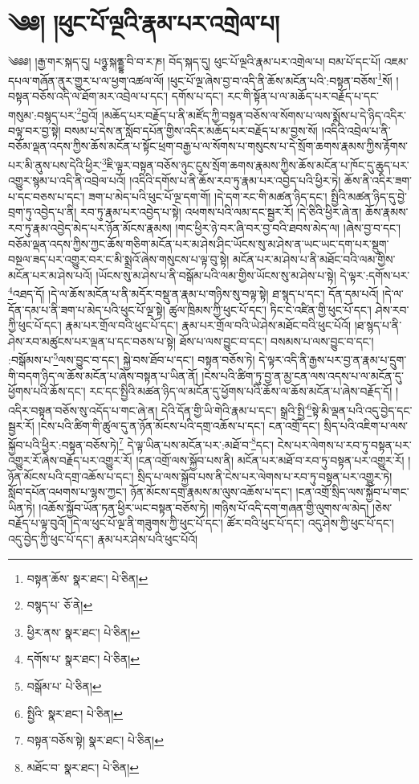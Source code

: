 \setcounter{footnote}{0} 
\chapter{༄༅། །ཕུང་པོ་ལྔའི་རྣམ་པར་འགྲེལ་པ།}༄༅༅། །རྒྱ་གར་སྐད་དུ། པཉྩ་སྐནྡྷ་བི་བ་ར་ཎ། བོད་སྐད་དུ། ཕུང་པོ་ལྔའི་རྣམ་པར་འགྲེལ་པ། བམ་པོ་དང་པོ། འཇམ་དཔལ་གཞོན་ནུར་གྱུར་པ་ལ་ཕྱག་འཚལ་ལོ། །ཕུང་པོ་ལྔ་ཞེས་བྱ་བ་འདི་ནི་ཆོས་མངོན་པའི་:བསྟན་བཅོས་\footnote{བསྟན་ཆོས་  སྣར་ཐང་།  པེ་ཅིན། }སོ། །བསྟན་བཅོས་འདི་ལ་ཐོག་མར་འབྲེལ་པ་དང་། དགོས་པ་དང་། རང་གི་སྟོན་པ་ལ་མཆོད་པར་བརྗོད་པ་དང་གསུམ་:བསྙད་པར་\footnote{བསྙད་པ་  ཅོ་ནེ། }བྱའོ། །མཆོད་པར་བརྗོད་པ་ནི་མཛོད་ཀྱི་བསྟན་བཅོས་ལ་སོགས་པ་ལས་སྨོས་པ་དེ་ཉིད་འདིར་བལྟ་བར་བྱ་སྟེ། བསམ་པ་དེས་ན་སློབ་དཔོན་གྱིས་འདིར་མཆོད་པར་བརྗོད་པ་མ་བྱས་སོ། །འདིའི་འབྲེལ་པ་ནི་བཅོམ་ལྡན་འདས་ཀྱིས་ཆོས་མངོན་པ་སྟོང་ཕྲག་བརྒྱ་པ་ལ་སོགས་པ་གསུངས་པ་དེ་སྲོག་ཆགས་རྣམས་ཀྱིས་རྟོགས་པར་མི་ནུས་པས་དེའི་ཕྱིར་\footnote{ཕྱིར་ནས་  སྣར་ཐང་།  པེ་ཅིན། }ཇི་ལྟར་བསྟན་བཅོས་ཉུང་ངུས་སྲོག་ཆགས་རྣམས་ཀྱིས་ཆོས་མངོན་པ་ཁོང་དུ་ཆུད་པར་འགྱུར་སྙམ་པ་འདི་ནི་འབྲེལ་པའོ། །འདིའི་དགོས་པ་ནི་ཆོས་རབ་ཏུ་རྣམ་པར་འབྱེད་པའི་ཕྱིར་ཏེ། ཆོས་ནི་འདིར་ཟག་པ་དང་བཅས་པ་དང་། ཟག་པ་མེད་པའི་ཕུང་པོ་ལྔ་དག་གོ། །དེ་དག་རང་གི་མཚན་ཉིད་དང་། སྤྱིའི་མཚན་ཉིད་དུ་བྱེ་བྲག་ཏུ་འབྱེད་པ་ནི། རབ་ཏུ་རྣམ་པར་འབྱེད་པ་སྟེ། འཕགས་པའི་ལམ་དང་སྦྱར་རོ། །དེ་ཅིའི་ཕྱིར་ཞེ་ན། ཆོས་རྣམས་རབ་ཏུ་རྣམ་འབྱེད་མེད་པར་ཉོན་མོངས་རྣམས། །གང་ཕྱིར་ཉེ་བར་ཞི་བར་བྱ་བའི་ཐབས་མེད་ལ། །ཞེས་བྱ་བ་དང་། བཅོམ་ལྡན་འདས་ཀྱིས་ཀྱང་ཆོས་གཅིག་མངོན་པར་མ་ཤེས་ཤིང་ཡོངས་སུ་མ་ཤེས་ན་ཡང་ཡང་དག་པར་སྡུག་བསྔལ་ཟད་པར་འགྱུར་བར་ང་མི་སྨྲའོ་ཞེས་གསུངས་པ་ལྟ་བུ་སྟེ། མངོན་པར་མ་ཤེས་པ་ནི་མཐོང་བའི་ལམ་གྱིས་མངོན་པར་མ་ཤེས་པའོ། །ཡོངས་སུ་མ་ཤེས་པ་ནི་བསྒོམ་པའི་ལམ་གྱིས་ཡོངས་སུ་མ་ཤེས་པ་སྟེ། དེ་ལྟར་:དགོས་པར་\footnote{དགོས་པ་  སྣར་ཐང་།  པེ་ཅིན། }འཐད་དོ། །དེ་ལ་ཆོས་མངོན་པ་ནི་མདོར་བསྡུ་ན་རྣམ་པ་གཉིས་སུ་བལྟ་སྟེ། ཐ་སྙད་པ་དང་། དོན་དམ་པའོ། །དེ་ལ་དོན་དམ་པ་ནི་ཟག་པ་མེད་པའི་ཕུང་པོ་ལྔ་སྟེ། ཚུལ་ཁྲིམས་ཀྱི་ཕུང་པོ་དང་། ཏིང་ངེ་འཛིན་གྱི་ཕུང་པོ་དང་། ཤེས་རབ་ཀྱི་ཕུང་པོ་དང་། རྣམ་པར་གྲོལ་བའི་ཕུང་པོ་དང་། རྣམ་པར་གྲོལ་བའི་ཡེ་ཤེས་མཐོང་བའི་ཕུང་པོའོ། །ཐ་སྙད་པ་ནི་ཤེས་རབ་མཚུངས་པར་ལྡན་པ་དང་བཅས་པ་སྟེ། ཐོས་པ་ལས་བྱུང་བ་དང་། བསམས་པ་ལས་བྱུང་བ་དང་། :བསྒོམས་པ་\footnote{བསྒོམ་པ་  པེ་ཅིན། }ལས་བྱུང་བ་དང་། སྐྱེ་བས་ཐོབ་པ་དང་། བསྟན་བཅོས་ཏེ། དེ་ལྟར་འདི་ནི་རྒྱས་པར་བྱ་ན་རྣམ་པ་དྲུག་གི་བདག་ཉིད་ལ་ཆོས་མངོན་པ་ཞེས་བསྟན་པ་ཡིན་ནོ། །ངེས་པའི་ཚིག་ཏུ་བྱ་ན་མྱ་ངན་ལས་འདས་པ་ལ་མངོན་དུ་ཕྱོགས་པའི་ཆོས་དང་། རང་དང་སྤྱིའི་མཚན་ཉིད་ལ་མངོན་དུ་ཕྱོགས་པའི་ཆོས་ལ་ཆོས་མངོན་པ་ཞེས་བརྗོད་དོ། །འདིར་བསྟན་བཅོས་སུ་འདོད་པ་གང་ཞེ་ན། དེའི་དོན་གྱི་ཡི་གེའི་རྣམ་པ་དང་། སྒྲའི་སྤྱི་\footnote{སྤྱིའི་  སྣར་ཐང་།  པེ་ཅིན། }སྟེ་མི་ལྡན་པའི་འདུ་བྱེད་དང་སྦྱར་རོ། །ངེས་པའི་ཚིག་གི་ཚུལ་དུ་ན་ཉོན་མོངས་པའི་དགྲ་འཆོས་པ་དང་། ངན་འགྲོ་དང་། སྲིད་པའི་འཇིག་པ་ལས་སྐྱོབ་པའི་ཕྱིར་:བསྟན་བཅོས་ཏེ།\footnote{བསྟན་བཅོས་སྟེ།  སྣར་ཐང་།  པེ་ཅིན། } དེ་ལྟ་ཡིན་པས་མངོན་པར་:མཐོ་བ་\footnote{མཐོང་བ་  སྣར་ཐང་།  པེ་ཅིན། }དང་། ངེས་པར་ལེགས་པ་རབ་ཏུ་བསྟན་པར་འགྱུར་རོ་ཞེས་བརྗོད་པར་འགྱུར་རོ། །ངན་འགྲོ་ལས་སྐྱོབ་པས་ནི། མངོན་པར་མཐོ་བ་རབ་ཏུ་བསྟན་པར་འགྱུར་རོ། །ཉོན་མོངས་པའི་དགྲ་འཆོས་པ་དང་། སྲིད་པ་ལས་སྐྱོབ་པས་ནི་ངེས་པར་ལེགས་པ་རབ་ཏུ་བསྟན་པར་འགྱུར་ཏེ། སློབ་དཔོན་འཕགས་པ་ལྷས་ཀྱང་། ཉོན་མོངས་དགྲ་རྣམས་མ་ལུས་འཆོས་པ་དང་། །ངན་འགྲོ་སྲིད་ལས་སྐྱོབ་པ་གང་ཡིན་ཏེ། །འཆོས་སྐྱོབ་ཡོན་ཏན་ཕྱིར་ཡང་བསྟན་བཅོས་ཏེ། །གཉིས་པོ་འདི་དག་གཞན་གྱི་ལུགས་ལ་མེད། །ཅེས་བརྗོད་པ་ལྟ་བུའོ། །དེ་ལ་ཕུང་པོ་ལྔ་ནི་གཟུགས་ཀྱི་ཕུང་པོ་དང་། ཚོར་བའི་ཕུང་པོ་དང་། འདུ་ཤེས་ཀྱི་ཕུང་པོ་དང་། འདུ་བྱེད་ཀྱི་ཕུང་པོ་དང་། རྣམ་པར་ཤེས་པའི་ཕུང་པོའོ། 